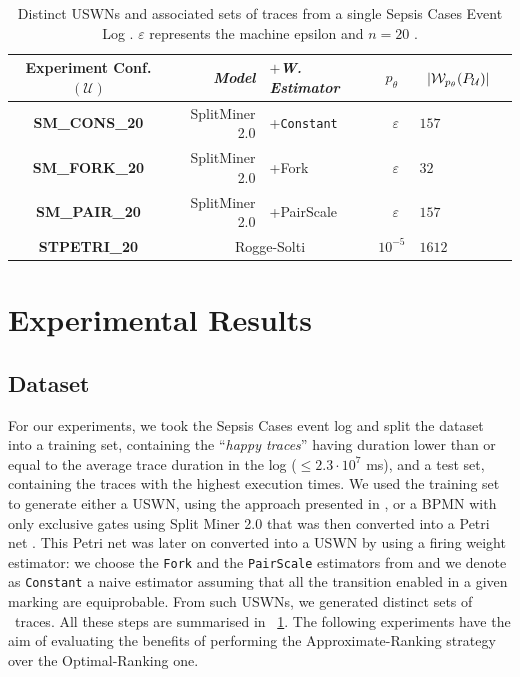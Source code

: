 \begin{table}[!t]
\caption{Distinct USWNs and associated sets of \unravelled traces from a single Sepsis Cases Event Log \cite{mannhardt_2016}. $\varepsilon$ represents the machine epsilon \ifdefined\WWITHN and $n=20$ \fi.}\label{tab:dataset}
\centering
 \begin{adjustbox}{max width=\textwidth}
	\begin{tabular}{crl||cl|c}
		\toprule
		\textbf{Experiment Conf.} $(\mathcal{U})$ & \textit{Model} & $+$\textit{W. Estimator} & $p_\theta$& $\;\;|\WCal{p_\theta}{n}(P_{\mathcal{U}})|$ \\
		\midrule
		
		\textbf{SM\_CONS\_20} &SplitMiner 2.0  \cite{AugustoCDRP19}       & +\texttt{Constant} &  $\;\;\varepsilon$ & $157$  \\
		
		\textbf{SM\_FORK\_20} & SplitMiner 2.0  \cite{AugustoCDRP19}      & +Fork \cite{spdwe} &  $\;\;\varepsilon$ & $32$  \\
		
		
		\textbf{SM\_PAIR\_20} & SplitMiner 2.0  \cite{AugustoCDRP19}      & +PairScale \cite{spdwe} &  $\;\;\varepsilon$ & $157$ \\

		\textbf{STPETRI\_20} & \multicolumn{2}{c||}{Rogge-Solti \cite{RoggeSoltiAW13}} &  $10^{-5}$ & $1612$ \\
		\bottomrule
	\end{tabular}
\end{adjustbox}
\end{table}
\section{Experimental Results}\label{sec:exp}
\subsection{Dataset}
For our experiments, we took the Sepsis Cases event log \cite{mannhardt_2016} and split the dataset into a training set, containing the ``\textit{happy traces}''  having duration lower than or equal to the average trace duration in the log ($\leq 2.3\cdot 10^{7}$ ms), and a test set, containing the traces with the highest execution times. We used the training set to generate either a USWN, using the approach presented in \cite{RoggeSoltiAW13}, or a BPMN with only exclusive gates using Split Miner 2.0 \cite{AugustoCDRP19} that was then converted into a Petri net \cite{PPNFromLog}. This Petri net was later on converted into a USWN by using a firing weight estimator: we choose the \texttt{Fork} and the \texttt{PairScale} estimators from \cite{spdwe} and we denote as \texttt{Constant} a naive estimator assuming that all the transition enabled in a given marking are equiprobable. %
From such USWNs, we generated distinct sets of \unravelled\ traces. All these steps are summarised in \tablename~\ref{tab:dataset}. The following experiments have the aim of evaluating the benefits of performing the Approximate-Ranking strategy over the Optimal-Ranking one.

